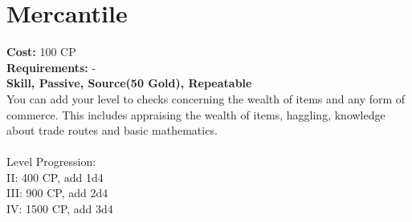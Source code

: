\section{Mercantile}
\textbf{Cost:} 100 CP\\
\textbf{Requirements:} -\\
\textbf{Skill, Passive, Source(50 Gold), Repeatable}\\
You can add your level to checks concerning the wealth of items and any form of commerce. This includes appraising the wealth of items, haggling, knowledge about trade routes and basic mathematics.\\
\\
Level Progression:\\
II: 400 CP, add 1d4\\
III: 900 CP, add 2d4\\
IV: 1500 CP, add 3d4\\